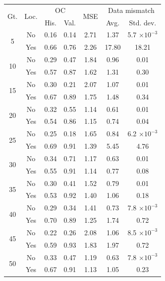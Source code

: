 \begin{tabular}{ccccccc}
\toprule
\multirow{2}{*}{
    Gt.
}
&
\multirow{2}{*}{Loc.} 
& 
\multicolumn{2}{c}{OC} & 
\multirow{2}{*}{
    MSE
} & 
\multicolumn{2}{c}{Data mismatch} 
\\
& & His. & Val. &  & Avg. & Std. dev.
\\
\midrule
\multirow{2}{*}{5} & No & 0.16 & 0.14 & 2.71 & 1.37 & 5.7 $\times 10^{-3}$ \\
 & Yes & 0.66 & 0.76 & 2.26 & 17.80 & 18.21 \\
\midrule
\multirow{2}{*}{10} & No & 0.29 & 0.47 & 1.84 & 0.96 & 0.01 \\
 & Yes & 0.57 & 0.87 & 1.62 & 1.31 & 0.30 \\
\midrule
\multirow{2}{*}{15} & No & 0.30 & 0.21 & 2.07 & 1.07 & 0.01 \\
 & Yes & 0.67 & 0.89 & 1.75 & 1.48 & 0.34 \\
\midrule
\multirow{2}{*}{20} & No & 0.32 & 0.55 & 1.14 & 0.61 & 0.01 \\
 & Yes & 0.54 & 0.86 & 1.15 & 0.74 & 0.04 \\
\midrule
\multirow{2}{*}{25} & No & 0.25 & 0.18 & 1.65 & 0.84 & 6.2 $\times 10^{-3}$ \\
 & Yes & 0.69 & 0.91 & 1.39 & 5.45 & 4.76 \\
\midrule
\multirow{2}{*}{30} & No & 0.34 & 0.71 & 1.17 & 0.63 & 0.01 \\
 & Yes & 0.55 & 0.91 & 1.14 & 0.77 & 0.08 \\
\midrule
\multirow{2}{*}{35} & No & 0.30 & 0.41 & 1.52 & 0.79 & 0.01 \\
 & Yes & 0.53 & 0.92 & 1.40 & 1.06 & 0.18 \\
\midrule
\multirow{2}{*}{40} & No & 0.29 & 0.34 & 1.41 & 0.73 & 7.8 $\times 10^{-3}$ \\
 & Yes & 0.70 & 0.89 & 1.25 & 1.74 & 0.72 \\
\midrule
\multirow{2}{*}{45} & No & 0.22 & 0.26 & 2.08 & 1.06 & 8.5 $\times 10^{-3}$ \\
 & Yes & 0.59 & 0.93 & 1.83 & 1.97 & 0.72 \\
\midrule
\multirow{2}{*}{50} & No & 0.33 & 0.47 & 1.19 & 0.63 & 7.8 $\times 10^{-3}$ \\
 & Yes & 0.67 & 0.91 & 1.13 & 1.05 & 0.23 \\
\bottomrule
\end{tabular}
